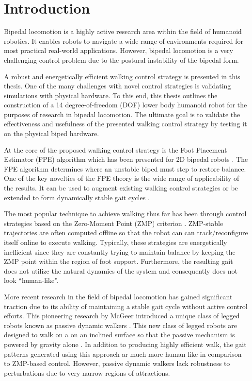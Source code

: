 \chapter{Introduction} %
\label{cha:introduction}
Bipedal locomotion is a highly active research area within the field of humanoid robotics. It enables robots to navigate a wide range of environments required for most practical real-world applications. However, bipedal locomotion is a very challenging control problem due to the postural instability of the bipedal form.

A robust and energetically efficient walking control strategy is presented in this thesis. One of the many challenges with novel control strategies is validating simulations with physical hardware. To this end, this thesis outlines the construction of a 14 degree-of-freedom (DOF) lower body humanoid robot for the purposes of research in bipedal locomotion. The ultimate goal is to validate the effectiveness and usefulness of the presented walking control strategy by testing it on the physical biped hardware. 

At the core of the proposed walking control strategy is the Foot Placement Estimator (FPE) algorithm which has been presented for 2D bipedal robots \cite{Wight:2008vt}. The FPE algorithm determines where an unstable biped must step to restore balance. One of the key novelties of the FPE theory is the wide range of applicability of the results. It can be used to augment existing walking control strategies or be extended to form dynamically stable gait cycles \cite{Wight:2008ii}.

The most popular technique to achieve walking thus far has been through control strategies based on the Zero-Moment Point (ZMP) criterion \cite{Vukobratovic:2004wy}. ZMP-stable trajectories are often computed offline so that the robot can can track/reconfigure itself online to execute walking. Typically, these strategies \cite{Kajita:1997vr,Sugihara:2002kq} are energetically inefficient since they are constantly trying to maintain balance by keeping the ZMP point within the region of foot support. Furthermore, the resulting gait does not utilize the natural dynamics of the system and consequently does not look ``human-like''. 

More recent research in the field of bipedal locomotion has gained significant traction due to its ability of maintaining a stable gait cycle without active control efforts. This pioneering research by McGeer \cite{McGeer:1990uk} introduced a unique class of legged robots known as passive dynamic walkers \cite{Collins:2005vp}. This new class of legged robots are designed to walk on a on an inclined surface so that the passive mechanism is powered by gravity alone \cite{Spong:1999vk}. In addition to producing highly efficient walk, the gait patterns generated using this approach ar much more human-like in comparison to ZMP-based control. However, passive dynamic walkers lack robustness to perturbations due to very narrow regions of attractions. 

